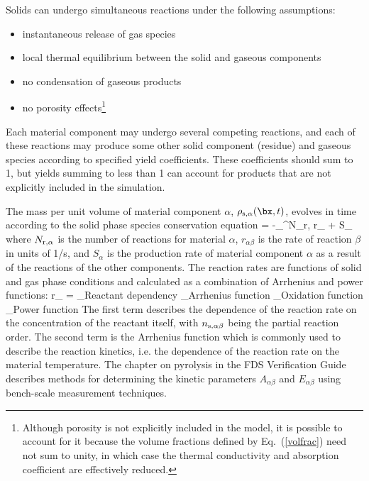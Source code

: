 Solids can undergo simultaneous reactions under the following assumptions:
\begin{itemize}
\setlength{\itemsep}{0.0in}
\item instantaneous release of gas species
\item local thermal equilibrium between the solid and gaseous components
\item no condensation of gaseous products
\item no porosity effects\footnote{Although porosity is not explicitly included in the model, it is possible to account for it because the volume fractions defined by Eq.~(\ref{volfrac}) need not sum to unity, in which case the thermal conductivity and absorption coefficient are effectively reduced.}
\end{itemize}
Each material component may undergo several competing reactions, and each of these reactions may produce some other solid component (residue) and gaseous species according to specified yield coefficients.  These coefficients should sum to 1, but yields summing to less than 1 can account for products that are not explicitly included in the simulation.

The mass per unit volume of material component $\alpha$, $\rho_{\rm s,\alpha}(\bx,t)$, evolves in time according to the solid phase species conservation equation
\be
    = -\sum_{}^{N_{\rm r,\alpha}} r_{\alpha \beta} + S_\alpha
  \label{solid_species_conservation}
\ee
where $N_{\rm r,\alpha}$ is the number of reactions for material $\alpha$, $r_{\alpha \beta}$ is the rate of reaction $\beta$ in units of \si{1/s}, and $S_\alpha$ is the production rate of material component $\alpha$ as a result of the reactions of the other components. The reaction rates are functions of solid and gas phase conditions and calculated as a combination of Arrhenius and power functions:
\be
r_{\alpha \beta} =
    _\textrm{Reactant dependency}
    _\textrm{Arrhenius function}
    _\textrm{Oxidation function}
    _\textrm{Power function}
   \label{Arrhenius}
\ee
The first term describes the dependence of the reaction rate on the concentration of the reactant itself, with $n_{\rm s,\alpha\beta}$ being the partial reaction order. The second term is the Arrhenius function which is commonly used to describe the reaction kinetics, i.e. the dependence of the reaction rate on the material temperature. The chapter on pyrolysis in the FDS Verification Guide describes methods for determining the kinetic parameters $A_{\alpha \beta}$ and $E_{\alpha\beta}$ using bench-scale measurement techniques.

